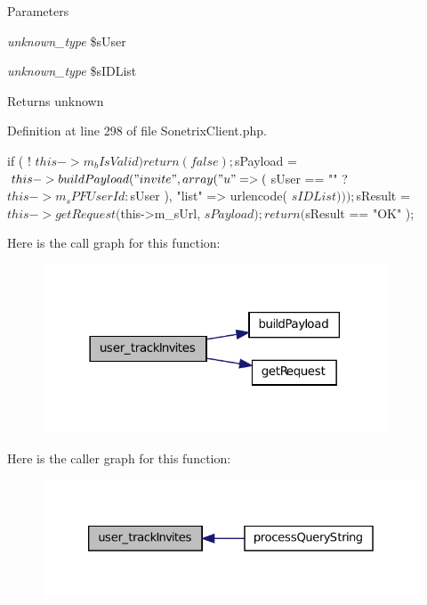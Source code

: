 \begin{DoxyParams}{Parameters}
\item[{\em unknown\_\-type}]\$sUser \item[{\em unknown\_\-type}]\$sIDList \end{DoxyParams}
\begin{DoxyReturn}{Returns}
unknown 
\end{DoxyReturn}


Definition at line 298 of file SonetrixClient.php.




\begin{DoxyCode}
    {
        if ( ! $this->m_bIsValid )
            return( false );

        $sPayload = $this->buildPayload( "invite", array( "u" => ( $sUser == "" ?
       $this->m_sPFUserId : $sUser ), "list" => urlencode( $sIDList ) ) );
        $sResult = $this->getRequest( $this->m_sUrl, $sPayload );
        return( $sResult == "OK" );
    }
\end{DoxyCode}




Here is the call graph for this function:\nopagebreak
\begin{figure}[H]
\begin{center}
\leavevmode
\includegraphics[width=290pt]{classSonetrixClient_a09ca56569d3a84b88e047acf61b86b35_cgraph}
\end{center}
\end{figure}




Here is the caller graph for this function:\nopagebreak
\begin{figure}[H]
\begin{center}
\leavevmode
\includegraphics[width=326pt]{classSonetrixClient_a09ca56569d3a84b88e047acf61b86b35_icgraph}
\end{center}
\end{figure}


